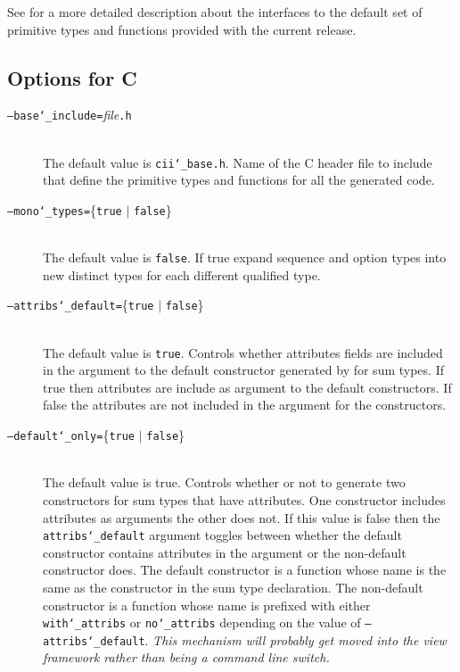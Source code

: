 See  for a more detailed description about the interfaces
to the default set of primitive types and functions provided with the current release.

\subsection{Options for C}
 \begin{description}
   \item[\normalfont\texttt{--base\char`\_include=}\textit{file}\texttt{.h}] \mbox{}\\
     The default value is \texttt{cii\char`\_base.h}. Name of the C header file to
     include that define the primitive types and functions for all the generated
     code.

   \item[\normalfont\texttt{--mono\char`\_types=}\{\texttt{true} $|$ \texttt{false}\}] \mbox{}\\
     The default value is \texttt{false}. If true expand sequence and option types into
     new distinct types for each different qualified type.

   \item[\normalfont\texttt{--attribs\char`\_default=}\{\texttt{true} $|$ \texttt{false}\}] \mbox{}\\
     The default value is \texttt{true}. Controls whether attributes fields are included in
     the argument to the default constructor generated by \asdlgen{} for sum
     types. If true then attributes are include as argument to the default
     constructors. If false the attributes are not included in the argument for
     the constructors.

   \item[\normalfont\texttt{--default\char`\_only=}\{\texttt{true} $|$ \texttt{false}\}] \mbox{}\\
     The default value is true. Controls whether or not to generate two
     constructors for sum types that have attributes. One constructor includes
     attributes as arguments the other does not. If this value is false then
     the \texttt{attribs\char`\_default} argument toggles between whether the default
     constructor contains attributes in the argument or the non-default
     constructor does. The default constructor is a function whose name is the
     same as the constructor in the sum type declaration. The non-default
     constructor is a function whose name is prefixed with either
     \texttt{with\char`\_attribs} or \texttt{no\char`\_attribs} depending on the value of
     \texttt{--attribs\char`\_default}.
     \textit{This mechanism will probably get moved
     into the view framework rather than being a command line switch.}
\end{description}%

